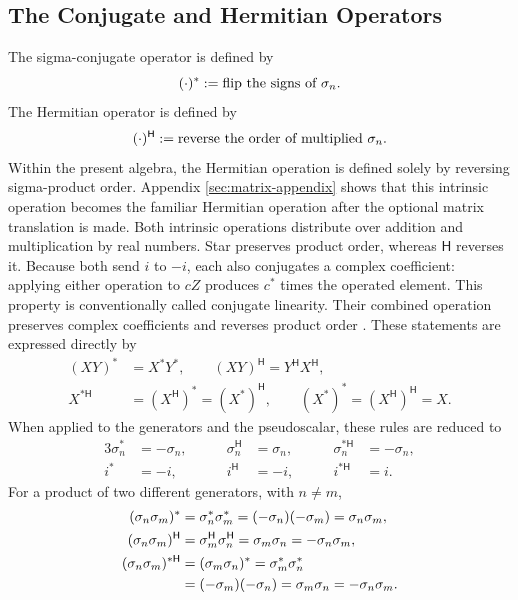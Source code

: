 \documentclass[10pt,letterpaper]{article}
\let\STAamsmathtext\text
\newcommand{\eqtext}[1]{\STAamsmathtext{\normalfont\rmfamily #1}}
\renewcommand{\text}[1]{\STAamsmathtext{\normalfont\rmfamily #1}}
\newcommand{\pv}[1]{#1}
\newcommand{\Hop}{\mathsf H}
\newcommand{\herm}[1]{#1^{\Hop}}
\newcommand{\conj}[1]{#1^{*}}
\newcommand{\cherm}[1]{#1^{*\Hop}}
\begin{document}
\subsection{The Conjugate and Hermitian Operators}
The sigma-conjugate operator is defined by
\begin{equation}
(\cdot)^* := \eqtext{flip the signs of } \pv{\sigma}_n.
\label{eq:star-definition}
\end{equation}
The Hermitian operator is defined by
\begin{equation}
(\cdot)^{\Hop} := \eqtext{reverse the order of multiplied } \pv{\sigma}_n.
\label{eq:hermitian-definition}
\end{equation}
Within the present algebra, the Hermitian operation is defined solely by
reversing sigma-product order. Appendix \ref{sec:matrix-appendix} shows that
this intrinsic operation becomes the familiar Hermitian operation after the
optional matrix translation is made. Both intrinsic operations distribute
over addition and multiplication by real
numbers. Star preserves product order, whereas \(\Hop\) reverses it. Because
both send \(i\) to \(-i\), each also conjugates a complex coefficient:
applying either operation to \(c\pv{Z}\) produces \(c^*\) times the operated
element. This property is conventionally called conjugate linearity. Their
combined operation preserves complex coefficients and reverses product order
\cite{hestenes1966,doran2003}. These statements are expressed directly by
\begin{equation}
\begin{aligned}
{(\pv{X}\pv{Y})}^{*}&=\pv{X}^{*}\pv{Y}^{*},\qquad
{(\pv{X}\pv{Y})}^{\Hop}=\pv{Y}^{\Hop}\pv{X}^{\Hop},\\
\pv{X}^{*\Hop}&=(\pv{X}^{\Hop})^{*}=(\pv{X}^{*})^{\Hop},\qquad
(\pv{X}^*)^*=(\pv{X}^{\Hop})^{\Hop}=\pv{X}.
\end{aligned}
\label{eq:operator-rules}
\end{equation}
When applied to the generators and the pseudoscalar, these rules are reduced to
\begin{alignat}{3}
\conj{\pv{\sigma}_n} &{}= -\pv{\sigma}_n, \qquad&
\herm{\pv{\sigma}_n} &{}= \pv{\sigma}_n, \qquad&
\cherm{\pv{\sigma}_n} &{}= -\pv{\sigma}_n,
\label{eq:sigma-operator-signs}\\
\conj{i} &{}= -i, \qquad&
\herm{i} &{}= -i, \qquad&
\cherm{i} &{}= i.
\label{eq:i-operator-signs}
\end{alignat}
For a product of two different generators, with \(n\neq m\),
\begin{align}
(\pv{\sigma}_n\pv{\sigma}_m)^*
&= \pv{\sigma}_n^*\pv{\sigma}_m^*
= (-\pv{\sigma}_n)(-\pv{\sigma}_m)
= \pv{\sigma}_n\pv{\sigma}_m,\notag\\
(\pv{\sigma}_n\pv{\sigma}_m)^{\Hop}
&= \pv{\sigma}_m^{\Hop}\pv{\sigma}_n^{\Hop}
= \pv{\sigma}_m\pv{\sigma}_n
= -\pv{\sigma}_n\pv{\sigma}_m,\notag\\
(\pv{\sigma}_n\pv{\sigma}_m)^{*\Hop}
&= (\pv{\sigma}_m\pv{\sigma}_n)^*
= \pv{\sigma}_m^*\pv{\sigma}_n^* \notag\\
&= (-\pv{\sigma}_m)(-\pv{\sigma}_n)
= \pv{\sigma}_m\pv{\sigma}_n
= -\pv{\sigma}_n\pv{\sigma}_m.
\label{eq:bivector-operator-signs}
\end{align}
\end{document}
